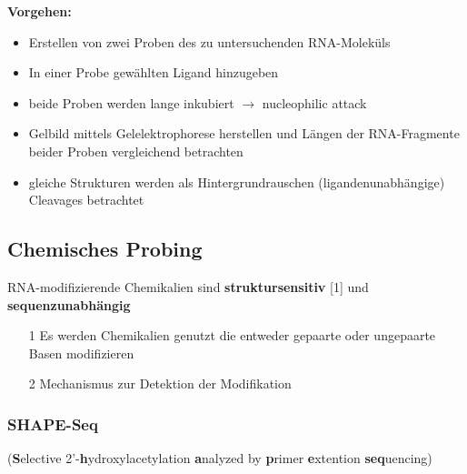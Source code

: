 \textbf{Vorgehen:}
\begin{itemize}
\item Erstellen von zwei Proben des zu untersuchenden RNA-Moleküls
\item In einer Probe gewählten Ligand hinzugeben
\item beide Proben werden lange inkubiert $\rightarrow$ nucleophilic attack
\item Gelbild mittels Gelelektrophorese herstellen und Längen der RNA-Fragmente beider Proben vergleichend betrachten
\item gleiche Strukturen werden als Hintergrundrauschen (ligandenunabhängige) Cleavages betrachtet
\end{itemize}

\subsection{Chemisches Probing}
RNA-modifizierende Chemikalien sind \textbf{struktursensitiv} [1] und \textbf{sequenzunabhängig} \\
\begin{itemize}
\item[1] Es werden Chemikalien genutzt die entweder gepaarte oder ungepaarte Basen modifizieren
\item[2] Mechanismus zur Detektion der Modifikation
\end{itemize}

\subsubsection{SHAPE-Seq}
(\textbf{S}elective 2'-\textbf{h}ydroxylacetylation \textbf{a}nalyzed by \textbf{p}rimer \textbf{e}xtention \textbf{seq}uencing)

